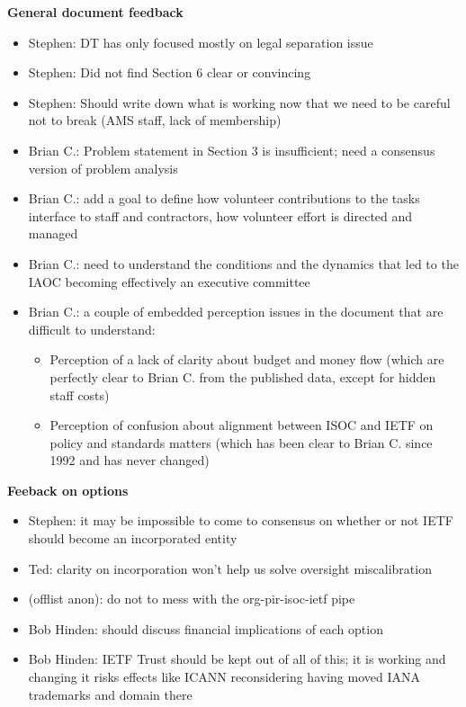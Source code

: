\documentclass[helvetica]{seminar}
\newcommand{\heading}[1]{%
  \begin{center} 
    \large\bf 
    #1 
  \end{center} 
  \vspace{.4 in}}
\begin{document}
\begin{slide}

\heading{General document feedback}


\begin{itemize}
\item Stephen: DT has only focused mostly on legal separation issue
\item Stephen: Did not find Section 6 clear or convincing
\item Stephen: Should write down what is working now that we need to
  be careful not to break (AMS staff, lack of membership)
\item Brian C.: Problem statement in Section 3 is insufficient; need a
  consensus version of problem analysis
\item Brian C.: add a goal to define how volunteer contributions to
  the tasks interface to staff and contractors, how volunteer effort
  is directed and managed
\item Brian C.: need to understand the conditions and the dynamics
  that led to the IAOC becoming effectively an executive committee
\item Brian C.: a couple of embedded perception issues in the document
  that are difficult to understand:
  \begin{itemize}
  \item Perception of a lack of clarity about budget and money flow
    (which are perfectly clear to Brian C. from the published data,
    except for hidden staff costs)
  \item Perception of confusion about alignment between ISOC and IETF
    on policy and standards matters (which has been clear to Brian
    C. since 1992 and has never changed)
  \end{itemize}
\end{itemize}

\end{slide}


\begin{slide}

\heading{Feeback on options}

\begin{itemize}
\item Stephen: it may be impossible to come to consensus on whether or
  not IETF should become an incorporated entity
\item Ted: clarity on incorporation won't help us solve oversight
  miscalibration
\item (offlist anon): do not to mess with the org-pir-isoc-ietf pipe
\item Bob Hinden: should discuss financial implications of each option
\item Bob Hinden: IETF Trust should be kept out of all of this; it is
  working and changing it risks effects like ICANN reconsidering
  having moved IANA trademarks and domain there
\end{itemize}

\end{slide}
\end{document}
